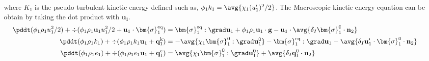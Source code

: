 where $K_1$ is the pseudo-turbulent kinetic energy defined such as, $\phi_1 k_1 = \avg{\chi_1 (u_1')^2/2}$. 
The Macroscopic kinetic energy equation can be obtain by taking the dot product with $\textbf{u}_1$. 
\begin{align}
    \pddt (\phi_1 \rho_1u_1^2/2)  
    + \div (
        \phi_1 \rho_1\textbf{u}_1u_1^2/2
        + \textbf{u}_1 \cdot \bm{\sigma}_1^\text{eq}
    )
    &= 
     \bm{\sigma}_1^\text{eq} : \grad \textbf{u}_1
    + \phi_1 \rho_1 \textbf{u}_1\cdot \textbf{g} 
    -  \textbf{u}_1\cdot \avg{\delta_I \bm{\sigma}_1^0 \cdot \textbf{n}_2}\\
    \pddt (\phi_1\rho_1k_1)  
    + \div (
        \phi_1\rho_1k_1\textbf{u}_1
        + \textbf{q}_1^\text{k} 
        )
    &= 
    - \avg{\chi_1\bm{\sigma}_1^0 : \grad \textbf{u}_1^0}
    - \bm{\sigma}_1^\text{eq} : \grad \textbf{u}_1
    - \avg{\delta_I \textbf{u}_1' \cdot \bm{\sigma}_1^0 \cdot \textbf{n}_2}\\
    \pddt (\phi_1\rho_1e_1)  
    + \div (
        \phi_1 \rho_1e_1\textbf{u}_1
        +
        \textbf{q}_1^\text{e} 
        )
    &= 
    \avg{\chi_1\bm{\sigma}_1^0 : \grad \textbf{u}_1^0}
    + \avg{\delta_I \textbf{q}_1^0 \cdot \textbf{n}_2} 
\end{align}


